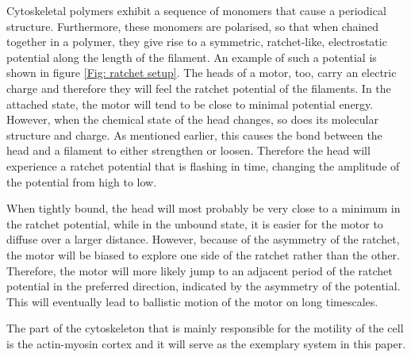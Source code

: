 \documentclass[aps,pre,twocolumn,showpacs,showkeys,a4paper]{revtex4}
\begin{document}
Cytoskeletal polymers exhibit a sequence of monomers that cause a periodical structure. 
Furthermore, these monomers are polarised, so that when chained together in a polymer, they give rise to a symmetric, ratchet-like, electrostatic potential along the length of the filament. 
An example of such a potential is shown in figure \ref{Fig: ratchet setup}. 
The heads of a motor, too, carry an electric charge and therefore they will feel the ratchet potential of the filaments. 
In the attached state, the motor will tend to be close to minimal potential energy. 
However, when the chemical state of the head changes, so does its molecular structure and charge. 
As mentioned earlier, this causes the bond between the head and a filament to either strengthen or loosen. 
Therefore the head will experience a ratchet potential that is flashing in time, changing the amplitude of the potential from high to low.


When tightly bound, the head will most probably be very close to a minimum in the ratchet potential, while in the unbound state, it is easier for the motor to diffuse over a larger distance. 
However, because of the asymmetry of the ratchet, the motor will be biased to explore one side of the ratchet rather than the other. 
Therefore, the motor will more likely jump to an adjacent period of the ratchet potential in the preferred direction, indicated by the asymmetry of the potential. 
This will eventually lead to ballistic motion of the motor on long timescales.


The part of the cytoskeleton that is mainly responsible for the motility of the cell is the actin-myosin cortex and it will serve as the exemplary system in this paper.
\end{document}
